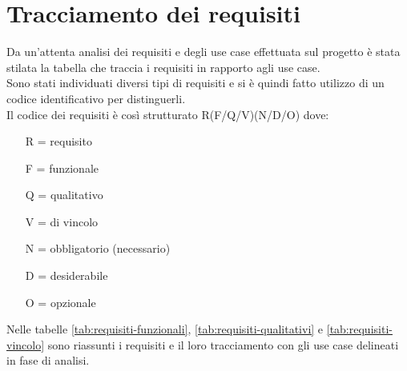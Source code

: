 \section{Tracciamento dei requisiti}

Da un'attenta analisi dei requisiti e degli use case effettuata sul progetto è stata stilata la tabella che traccia i requisiti in rapporto agli use case.\\
Sono stati individuati diversi tipi di requisiti e si è quindi fatto utilizzo di un codice identificativo per distinguerli.\\
Il codice dei requisiti è così strutturato R(F/Q/V)(N/D/O) dove:
\begin{enumerate}
	  \item[R =] requisito
    \item[F =] funzionale
    \item[Q =] qualitativo
    \item[V =] di vincolo
    \item[N =] obbligatorio (necessario)
    \item[D =] desiderabile
    \item[O =] opzionale
\end{enumerate}
Nelle tabelle \ref{tab:requisiti-funzionali}, \ref{tab:requisiti-qualitativi} e \ref{tab:requisiti-vincolo} sono riassunti i requisiti e il loro tracciamento con gli use case delineati in fase di analisi.

\newpage

